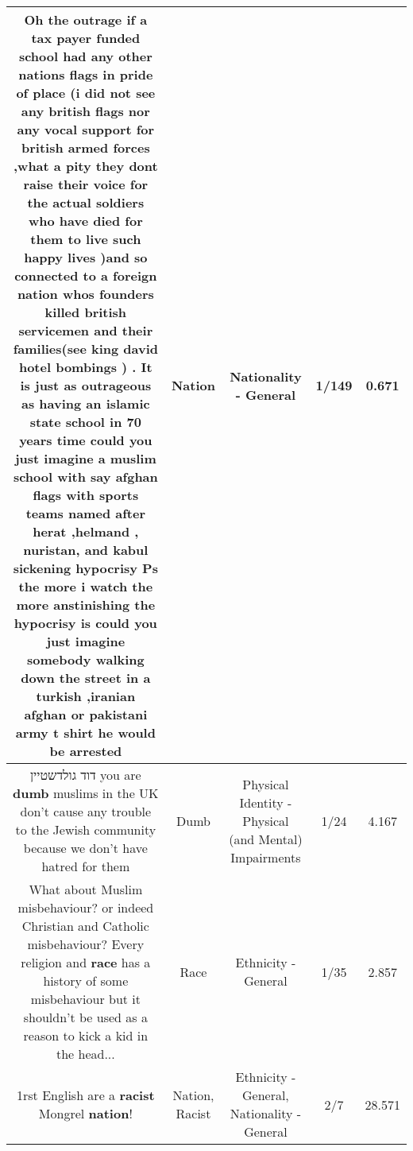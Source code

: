 \documentclass[11pt]{article}
\newlength\mylength
\begin{document}
\begin{center}
\begin{longtable}{|C{.65\mylength}|C{.30\mylength}|C{.12\mylength}|C{.12\mylength}|C{.12\mylength}|}
  \small Oh the outrage if a tax payer funded school had any other nations flags in pride of place (i did not see any british flags nor any vocal support for british armed forces ,what a pity they dont raise their voice for the actual soldiers who have died for them to live such happy lives )and so connected to a foreign \textbf{nation} whos founders killed british servicemen and their families(see king david hotel bombings ) . It is just as outrageous as having an islamic state school in 70 years time  could you just imagine a muslim school with say afghan flags with sports teams named after herat ,helmand , nuristan, and kabul sickening hypocrisy Ps the more i watch the more anstinishing the hypocrisy is could you just imagine somebody walking down the street in a turkish ,iranian afghan or  pakistani army t shirt he would be arrested\normalsize   & Nation & Nationality - General & 1/149 & 0.671 \\  \hline
  \small דוד גולדשטיין you are \textbf{dumb} muslims in the UK don't cause any trouble to the Jewish community because we don't have hatred for them\normalsize   & Dumb & Physical Identity - Physical (and Mental) Impairments & 1/24 & 4.167 \\  \hline
  \small What about Muslim misbehaviour? or indeed Christian and Catholic misbehaviour? Every religion and \textbf{race} has a history of some misbehaviour but it shouldn't be used as a reason to kick a kid in the head...\normalsize   & Race & Ethnicity - General & 1/35 & 2.857 \\  \hline
  \small 1rst English are a \textbf{racist} Mongrel \textbf{nation}!\normalsize   & Nation, Racist & Ethnicity - General, Nationality - General & 2/7 & 28.571 \\  \hline

\end{longtable}
\end{center}
\end{document}
